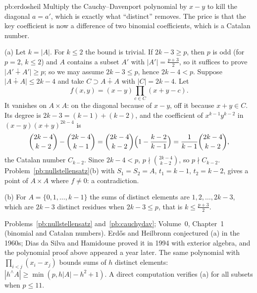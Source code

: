 \begin{solution}{pb:erdosheil}
\idea Multiply the Cauchy--Davenport polynomial by $x-y$ to kill the diagonal $a=a'$, which is exactly what ``distinct'' removes.
The price is that the key coefficient is now a difference of two binomial coefficients, which is a Catalan number.

\writeup (a) Let $k=|A|$. For $k\le2$ the bound is trivial. If $2k-3\ge p$, then $p$ is odd (for $p=2$, $k\le2$) and $A$ contains a
subset $A'$ with $|A'|=\frac{p+3}2$, so it suffices to prove $|A'\dotplus A'|\ge p$; so we may assume $2k-3\le p$, hence
$2k-4<p$. Suppose $|A\dotplus A|\le2k-4$ and take $C\supset A\dotplus A$ with $|C|=2k-4$. Let
\[
f(x,y)=(x-y)\prod_{c\in C}(x+y-c).
\]
It vanishes on $A\times A$: on the diagonal because of $x-y$, off it because $x+y\in C$. Its degree is $2k-3=(k-1)+(k-2)$, and the
coefficient of $x^{k-1}y^{k-2}$ in $(x-y)(x+y)^{2k-4}$ is
\[
\binom{2k-4}{k-2}-\binom{2k-4}{k-1}=\binom{2k-4}{k-2}\Bigl(1-\frac{k-2}{k-1}\Bigr)=\frac1{k-1}\binom{2k-4}{k-2},
\]
the Catalan number $C_{k-2}$. Since $2k-4<p$, $p\nmid\binom{2k-4}{k-2}$, so $p\nmid C_{k-2}$. Problem~\ref{pb:nullstellensatz}(b) with
$S_1=S_2=A$, $t_1=k-1$, $t_2=k-2$, gives a point of $A\times A$ where $f\ne0$: a contradiction.

(b) For $A=\{0,1,\dots,k-1\}$ the sums of distinct elements are $1,2,\dots,2k-3$, which are $2k-3$ distinct residues when
$2k-3\le p$, that is $k\le\frac{p+3}2$.

\tools Problems~\ref{pb:nullstellensatz} and~\ref{pb:cauchydav}; Volume~0, Chapter~1 (binomial and Catalan numbers).
\leads Erdős and Heilbronn conjectured (a) in the 1960s; Dias da Silva and Hamidoune proved it in 1994 with exterior algebra, and
the polynomial proof above appeared a year later. The same polynomial with $\prod_{i<j}(x_i-x_j)$ bounds sums of $h$ distinct
elements: $|h^\wedge A|\ge\min(p,h|A|-h^2+1)$. A direct computation verifies (a) for all subsets when $p\le11$.
\end{solution}

